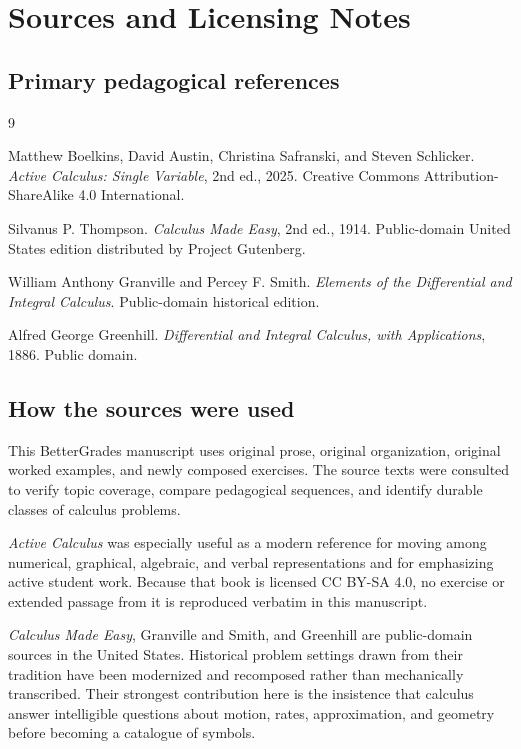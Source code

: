 \chapter{Sources and Licensing Notes}

\section*{Primary pedagogical references}

\begin{thebibliography}{9}

Matthew Boelkins, David Austin, Christina Safranski, and Steven Schlicker.
\emph{Active Calculus: Single Variable}, 2nd ed., 2025.
Creative Commons Attribution-ShareAlike 4.0 International.

Silvanus P. Thompson.
\emph{Calculus Made Easy}, 2nd ed., 1914.
Public-domain United States edition distributed by Project Gutenberg.

William Anthony Granville and Percey F. Smith.
\emph{Elements of the Differential and Integral Calculus}.
Public-domain historical edition.

Alfred George Greenhill.
\emph{Differential and Integral Calculus, with Applications}, 1886.
Public domain.

\end{thebibliography}

\section*{How the sources were used}

This BetterGrades manuscript uses original prose, original organization, original worked examples, and newly composed exercises. The source texts were consulted to verify topic coverage, compare pedagogical sequences, and identify durable classes of calculus problems.

\emph{Active Calculus} was especially useful as a modern reference for moving among numerical, graphical, algebraic, and verbal representations and for emphasizing active student work. Because that book is licensed CC BY-SA 4.0, no exercise or extended passage from it is reproduced verbatim in this manuscript.

\emph{Calculus Made Easy}, Granville and Smith, and Greenhill are public-domain sources in the United States. Historical problem settings drawn from their tradition have been modernized and recomposed rather than mechanically transcribed. Their strongest contribution here is the insistence that calculus answer intelligible questions about motion, rates, approximation, and geometry before becoming a catalogue of symbols.

